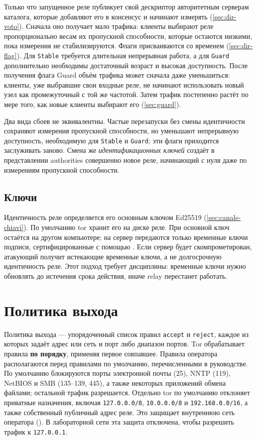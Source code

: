 Только что запущенное реле публикует свой дескриптор авторитетным серверам каталога, которые добавляют его в консенсус и начинают измерять (\cref{sec:dir-voto}). Сначала оно получает мало трафика: клиенты выбирают реле пропорционально весам их пропускной способности, которые остаются низкими, пока измерения не стабилизируются. Флаги присваиваются со временем (\cref{sec:dir-flag}). Для \texttt{Stable} требуется длительная непрерывная работа, а для \texttt{Guard} дополнительно необходимы достаточный возраст и высокая доступность. После получения флага Guard объём трафика может сначала даже уменьшиться: клиенты, уже выбравшие свои входные реле, не начинают использовать новый узел как промежуточный с той же частотой. Затем трафик постепенно растёт по мере того, как новые клиенты выбирают его (\cref{sec:guard}).

Два вида сбоев не эквивалентны. Частые перезапуски без смены идентичности сохраняют измерения пропускной способности, но уменьшают непрерывную доступность, необходимую для \texttt{Stable} и \texttt{Guard}; эти флаги приходится заслуживать заново. Смена же \emph{идентификационных ключей} создаёт в представлении authorities совершенно новое реле, начинающий с нуля даже по измерениям пропускной способности.

\subsection{Ключи}

Идентичность реле определяется его основным ключом Ed25519 (\cref{sec:canale-chiavi}). По умолчанию tor хранит его на диске реле. При  основной ключ остаётся на другом компьютере; на сервер передаются только временные ключи подписи, сертифицированные с помощью . Если сервер будет скомпрометирован, атакующий получит истекающие временные ключи, а не долгосрочную идентичность реле. Этот подход требует дисциплины: временные ключи нужно обновлять до истечения срока действия, иначе relay перестанет работать.

\section{Политика выхода}\label{sec:relay-exitpolicy}

Политика выхода — упорядоченный список правил \texttt{accept} и \texttt{reject}, каждое из которых задаёт адрес или сеть и порт либо диапазон портов. Tor обрабатывает правила \textbf{по порядку}, применяя первое совпавшее. Правила оператора располагаются перед правилами по умолчанию, перечисленными в руководстве. По умолчанию блокируются порты электронной почты (25), NNTP (119), NetBIOS и SMB (135--139, 445), а также некоторых приложений обмена файлами; остальной трафик разрешается. Отдельно tor по умолчанию отклоняет приватные назначения, включая \texttt{127.0.0.0/8}, \texttt{10.0.0.0/8} и \texttt{192.168.0.0/16}, а также собственный публичный адрес реле. Это защищает внутреннюю сеть оператора (). В лабораторной сети эта защита отключена, чтобы разрешить трафик к \texttt{127.0.0.1}.

